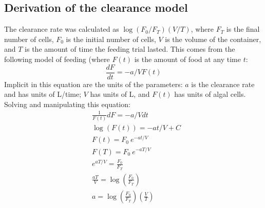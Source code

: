 \documentclass[11pt,reqno,final,pdftex]{amsart}\usepackage[]{graphicx}\usepackage[]{color}
\theoremstyle{plain}
\numberwithin{equation}{part}
\begin{document}
\subsection*{Derivation of the clearance model}
The clearance rate was calculated as $\log(F_0/F_T) (V/T)$, where $F_T$ is the final number of cells, $F_0$ is the initial number of cells, $V$ is the volume of the container, and $T$ is the amount of time the feeding trial lasted.
This comes from the following model of feeding (where $F(t)$ is the amount of food at any time $t$:
\begin{equation}
\frac{dF}{dt} = -a/V F(t)
\end{equation}
Implicit in this equation are the units of the parameters: $a$ is the clearance rate and has units of L/time; $V$ has units of L, and $F(t)$ has units of algal cells.
Solving and manipulating this equation:
\begin{align*}
&\frac{1}{F(t)} dF = -a/V dt \\
&\log(F(t)) = -at/V + C \\
&F(t) = F_0~e^{-at/V} \\
&F(T) = F_0~e^{-aT/V} \\
&e^{aT/V} = \frac{F_0}{F_T} \\
&\frac{aT}{V} = \log\left(\frac{F_0}{F_T}\right) \\
& a = \log\left(\frac{F_0}{F_T}\right) \left(\frac{V}{T}\right)
\end{align*}
\end{document}
